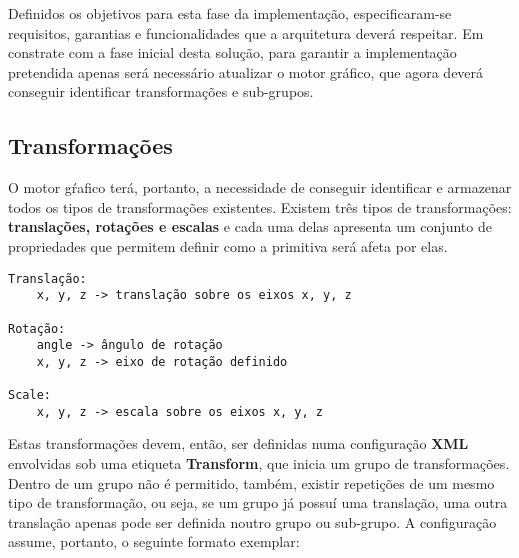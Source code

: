 Definidos os objetivos para esta fase da implementação,
especificaram-se requisitos, garantias e funcionalidades
que a arquitetura deverá respeitar.
\newline
\break
\noindent
Em constrate com a fase inicial desta solução, para
garantir a implementação pretendida apenas será
necessário atualizar o motor gráfico, que agora deverá
conseguir identificar transformações e sub-grupos.

\subsection{Transformações}

O motor gŕafico terá, portanto, a necessidade de
conseguir identificar e armazenar todos os tipos
de transformações existentes.
\newline
\break
\noindent
Existem três tipos de transformações:
\textbf{translações, rotações e escalas} e cada uma delas
apresenta um conjunto de propriedades que permitem
definir como a primitiva será afeta por elas.
\newline

\begin{tcolorbox}[
    colback=blue!10!white,
    colframe=black!50!black,
]
\begin{verbatim}
Translação:
    x, y, z -> translação sobre os eixos x, y, z

Rotação:
    angle -> ângulo de rotação
    x, y, z -> eixo de rotação definido

Scale:
    x, y, z -> escala sobre os eixos x, y, z
\end{verbatim}
\end{tcolorbox}

\vspace{12pt}
\noindent
Estas transformações devem, então, ser definidas numa
configuração \textbf{XML} envolvidas sob uma etiqueta
\textbf{Transform}, que inicia um grupo de
transformações.
\newline
\break
\noindent
Dentro de um grupo não é permitido, também,
existir repetições de um mesmo tipo de transformação,
ou seja, se um grupo já possuí uma translação, uma outra
translação apenas pode ser definida noutro grupo ou
sub-grupo.
\newline
\break
\noindent
A configuração assume, portanto, o seguinte
formato exemplar:
\newline

